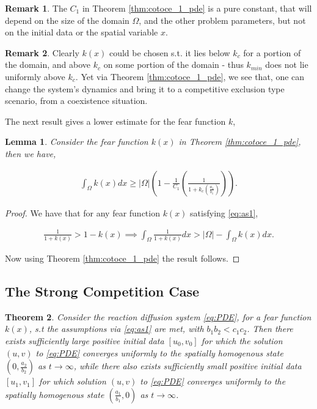 \documentclass[10pt]{amsart}
\newtheorem{theorem}{Theorem}[section]
\newtheorem{lemma}[theorem]{Lemma}
\theoremstyle{definition}
\newtheorem{remark}{Remark}
\begin{document}
\begin{remark}
The $C_{1}$ in Theorem \ref{thm:cotoce_1_pde} is a pure constant, that will depend on the size of the domain $\Omega$, and the other problem parameters, but not on the initial data or the spatial variable $x$.
\end{remark}




\begin{remark}
Clearly $k(x)$ could be chosen s.t. it lies below $k_{c}$ for a portion of the domain, and above $k_{c}$ on some portion of the domain - thus $k_{min}$ does not lie uniformly above $k_{c}$. Yet via Theorem \ref{thm:cotoce_1_pde}, we see that, one can change the system's dynamics and bring it to a competitive exclusion type scenario, from a coexistence situation.
\end{remark}

The next result gives a lower estimate for the fear function $k$,

\begin{lemma}
\label{lem:ff1}
Consider the fear function $k(x)$ in Theorem \ref{thm:cotoce_1_pde}, then we have,

\begin{align*}
	\int_{\Omega} k(x) dx  \geq  |\Omega|\left(1 - \frac{1}{C_{1}}\left(\frac{1}{1+k_{c} \left(\frac{a_{1}}{b_{1}}\right)} \right) \right).
\end{align*}

\end{lemma}

\begin{proof}
We have that for any fear function $k(x)$ satisfying \eqref{eq:as1},

\begin{align}\label{eq:com1}
	\frac{1}{1+k(x)} > 1 - k(x)  \implies \int_{\Omega} \frac{1}{1+k(x)} dx > |\Omega| - \int_{\Omega} k(x) dx.
\end{align}

Now using Theorem \ref{thm:cotoce_1_pde} the result follows.
\end{proof}





\subsection{The Strong Competition Case}



\begin{theorem}\label{st_pde}
	Consider the reaction diffusion system \eqref{eq:PDE}, for a fear function $k(x)$, s.t the assumptions via \eqref{eq:as1} are met, with $b_{1}b_{2} < c_{1}c_{2}$. Then there exists sufficiently large positive initial data $[u_0,v_0]$ for which the solution $(u,v)$ to \eqref{eq:PDE}  converges uniformly to the spatially homogenous state $(0,\frac{a_{2}}{b_{2}})$ as $t \to \infty$, while there also exists sufficiently small positive initial data $[u_1,v_1]$ for which solution $(u,v)$ to \eqref{eq:PDE}  converges uniformly to the spatially homogenous state $(\frac{a_{1}}{b_{1}},0)$ as $t \to \infty$.
\end{theorem}
\end{document}

